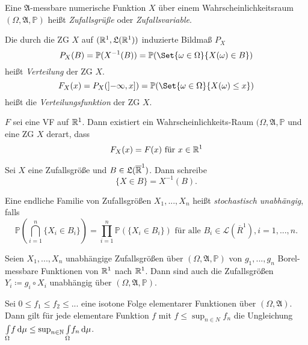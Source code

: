 \documentclass{cheat-sheet}
\newcommand{\Alg}{\mathfrak{A}}
\newcommand{\LebAlg}{\mathfrak{L}} %
\renewcommand{\P}{\mathbb{P}}
\newcommand{\IntOmu}[1]{\Int{\Omega}{}{#1}{\mu}} %
\begin{document}
\begin{defn}
  Eine $\Alg$-messbare numerische Funktion $X$ über einem Wahrscheinlichkeitsraum $(\Omega, \Alg, \P)$ heißt \emph{Zufallsgrüße} oder \emph{Zufallsvariable}.
\end{defn}

\begin{defn}
  Die durch die ZG $X$ auf $(\R^1, \LebAlg(\R^1))$ induzierte Bildmaß $P_X$
  \[ P_X(B) = \P(X^{-1}(B)) = \P(\Set{ \omega \in \Omega  }{ X(\omega) \in B }) \]
  heißt \emph{Verteilung} der ZG $X$.
  \[ F_X(x) = P_X(\left]-\infty, x\right]) = \P(\Set{ \omega \in \Omega }{ X(\omega) \leq x }) \]
  heißt die \emph{Verteilungsfunktion} der ZG $X$.
\end{defn}

\begin{satz}
  $F$ sei eine VF auf $\mathbb{R}^1$. Dann existiert ein Wahrscheinlichkeits-Raum $(\Omega, \Alg, \P$ und eine ZG $X$ derart, dass
  \[ F_X(x) = F(x) \text{ für } x \in \mathbb{R}^1 \]
\end{satz}

\begin{nota}
  Sei $X$ eine Zufallsgröße und $B \in \LebAlg(\overline{\R}^1)$. Dann schreibe
  \[ \{ X \in B \} = X^{-1}(B). \]
\end{nota}

\begin{defn}
  Eine endliche Familie von Zufallsgrößen $X_1, ..., X_n$ heißt \emph{stochastisch unabhängig}, falls
  \[ \P(\bigcap_{i=1}^n \{ X_i \in B_i \}) = \prod_{i=1}^n \P(\{ X_i \in B_i \}) \text{ für alle } B_i \in \mathcal{L}(\overline{R}^1), i = 1, ..., n. \]
\end{defn}

\begin{satz}
  Seien $X_1, ..., X_n$ unabhängige Zufallsgrößen über $(\Omega, \Alg, \P)$ von $g_1, ..., g_n$ Borel-messbare Funktionen von $\mathbb{R}^1$ nach $\mathbb{R}^1$. Dann sind auch die Zufallsgrößen $Y_i \coloneqq g_i \circ X_i$ unabhängig über $(\Omega, \Alg, \P)$.
\end{satz}



\begin{satz}
  Sei $0 \leq f_1 \leq f_2 \leq ...$ eine isotone Folge elementarer Funktionen über $(\Omega, \Alg)$. Dann gilt für jede elementare Funktion $f$ mit $f \leq \sup_{n \in N} f_n$ die Ungleichung $\IntOmu{f} \leq \sup_{n \in \N} \IntOmu{f_n}$.
\end{satz}
\end{document}
